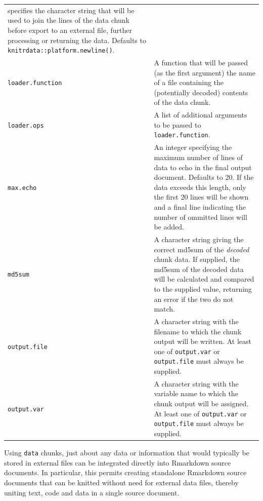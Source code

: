 \begin{longtable}[]{@{}
  >{\raggedright\arraybackslash}p{}
  >{\raggedright\arraybackslash}p{}@{}}
specifies the character string that will be used
to join the lines of the data chunk before export
to an external file, further processing or
returning the data. Defaults to
\texttt{knitrdata::platform.newline()}. \\
\texttt{loader.function} & A function that will be passed (as the first
argument) the name of a file containing the
(potentially decoded) contents of the data chunk. \\
\texttt{loader.ops} & A list of additional arguments to be passed to
\texttt{loader.function}. \\
\texttt{max.echo} & An integer specifying the maximum number of lines
of data to echo in the final output document.
Defaults to 20. If the data exceeds this length,
only the first 20 lines will be shown and a final
line indicating the number of ommitted lines will
be added. \\
\texttt{md5sum} & A character string giving the correct md5sum of
the \emph{decoded} chunk data. If supplied, the md5sum
of the decoded data will be calculated and
compared to the supplied value, returning an error
if the two do not match. \\
\texttt{output.file} & A character string with the filename to which the
chunk output will be written. At least one of
\texttt{output.var} or \texttt{output.file} must always be
supplied. \\
\texttt{output.var} & A character string with the variable name to which
the chunk output will be assigned. At least one of
\texttt{output.var} or \texttt{output.file} must always be
supplied. \\
\bottomrule
\end{longtable}

Using \texttt{data} chunks, just about any data or information that would typically be stored in external files can be integrated directly into Rmarkdown source documents. In particular, this permits creating standalone Rmarkdown source documents that can be knitted without need for external data files, thereby uniting text, code and data in a single source document.

